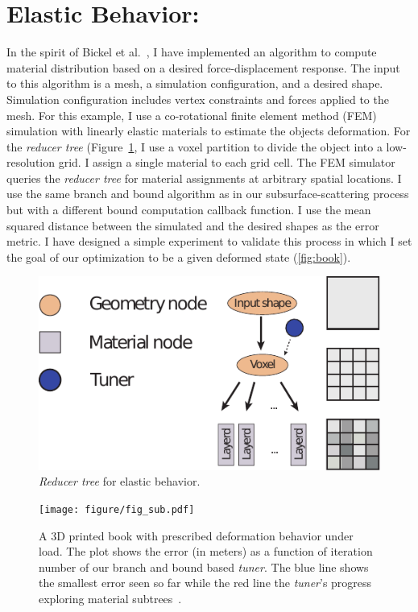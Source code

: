 \section{Elastic Behavior:}
In the spirit of Bickel et al.~,
I have implemented an algorithm to compute material distribution based on a desired force-displacement response.
The input to this algorithm is a mesh, a simulation configuration, and a desired shape.
Simulation configuration includes vertex constraints and forces applied to the mesh.
For this example, I use a co-rotational finite element method (FEM) simulation
with linearly elastic materials to estimate the objects deformation.
For the \emph{reducer tree} (Figure~\ref{fig:treeDeform},
I use a voxel partition to divide the object into a low-resolution grid.
I assign a single material to each grid cell.
The FEM simulator queries the \emph{reducer tree} for material assignments at arbitrary spatial locations.
I use the same branch and bound algorithm as in our subsurface-scattering process
but with a different bound computation callback function.
I use the mean squared distance between the simulated and the desired shapes as the error metric.
I have designed a simple experiment to validate this process
in which I set the goal of our optimization to be a given deformed state (\autoref{fig:book}).
\begin{figure}
\centering
\includegraphics[scale=0.7]{figure/treeDeform.pdf}
\caption {\emph{Reducer tree} for elastic behavior.
}
\label{fig:treeDeform}
\end{figure}

\begin{figure}
\centering
\texttt{[image: figure/fig\_sub.pdf]}
\caption {A 3D printed book with prescribed deformation behavior under load.
The plot shows the error (in meters) as a function of iteration number of our branch and bound based \emph{tuner}.
The blue line shows the smallest error seen so far while the red line the \emph{tuner}'s progress exploring material subtrees~\protect\cite{Bickel:2009}.}
\label{fig:book}
\end{figure}

